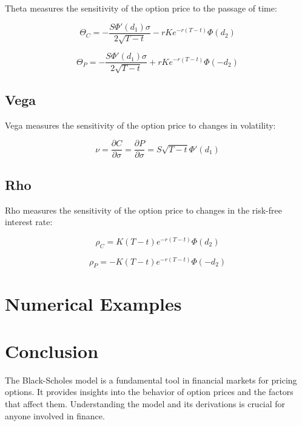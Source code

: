 \documentclass[../Main.tex]{subfiles}
\begin{document}
Theta measures the sensitivity of the option price to the passage of time:

\begin{equation}
    \Theta_C = -\frac{S \Phi'(d_1) \sigma}{2 \sqrt{T - t}} - r K e^{-r(T - t)} \Phi(d_2)
\end{equation}

\begin{equation}
    \Theta_P = -\frac{S \Phi'(d_1) \sigma}{2 \sqrt{T - t}} + r K e^{-r(T - t)} \Phi(-d_2)
\end{equation}

\subsection{Vega}

Vega measures the sensitivity of the option price to changes in volatility:

\begin{equation}
    \nu = \frac{\partial C}{\partial \sigma} = \frac{\partial P}{\partial \sigma} = S \sqrt{T - t} \Phi'(d_1)
\end{equation}

\subsection{Rho}

Rho measures the sensitivity of the option price to changes in the risk-free interest rate:

\begin{equation}
    \rho_C = K (T - t) e^{-r(T - t)} \Phi(d_2)
\end{equation}

\begin{equation}
    \rho_P = -K (T - t) e^{-r(T - t)} \Phi(-d_2)
\end{equation}


\section{Numerical Examples}



\section{Conclusion}

The Black-Scholes model is a fundamental tool in financial markets for pricing options. It provides insights into the behavior of option prices and the factors that affect them. Understanding the model and its derivations is crucial for anyone involved in finance.
\end{document}
